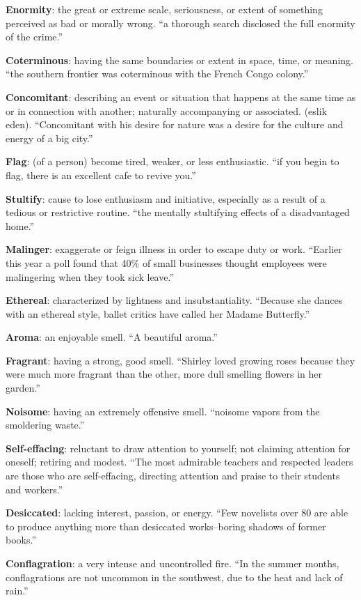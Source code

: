 \documentclass[12pt, a4paper]{ximera}
\begin{document}
\textbf{Enormity}: the great or extreme scale, seriousness, or extent of something perceived as bad or morally wrong. ``a thorough search disclosed the full enormity of the crime.''

\textbf{Coterminous}: having the same boundaries or extent in space, time, or meaning. ``the southern frontier was coterminous with the French Congo colony.''

\textbf{Concomitant}: describing an event or situation that happens at the same time as or in connection with another; naturally accompanying or associated. (eslik eden). ``Concomitant with his desire for nature was a desire for the culture and energy of a big city.''

\textbf{Flag}: (of a person) become tired, weaker, or less enthusiastic. ``if you begin to flag, there is an excellent cafe to revive you.''

\textbf{Stultify}: cause to lose enthusiasm and initiative, especially as a result of a tedious or restrictive routine. ``the mentally stultifying effects of a disadvantaged home.''

\textbf{Malinger}: exaggerate or feign illness in order to escape duty or work. ``Earlier this year a poll found that 40\% of small businesses thought employees were malingering when they took sick leave.''

\textbf{Ethereal}: characterized by lightness and insubstantiality. ``Because she dances with an ethereal style, ballet critics have called her Madame Butterfly.''

\textbf{Aroma}: an enjoyable smell. ``A beautiful aroma.''

\textbf{Fragrant}: having a strong, good smell. ``Shirley loved growing roses because they were much more fragrant than the other, more dull smelling flowers in her garden.''

\textbf{Noisome}: having an extremely offensive smell. ``noisome vapors from the smoldering waste.''

\textbf{Self-effacing}: reluctant to draw attention to yourself; not claiming attention for oneself; retiring and modest. ``The most admirable teachers and respected leaders are those who are self-effacing, directing attention and praise to their students and workers.''

\textbf{Desiccated}: lacking interest, passion, or energy. ``Few novelists over 80 are able to produce anything more than desiccated works--boring shadows of former books.''

\textbf{Conflagration}: a very intense and uncontrolled fire. ``In the summer months, conflagrations are not uncommon in the southwest, due to the heat and lack of rain.''
\end{document}
